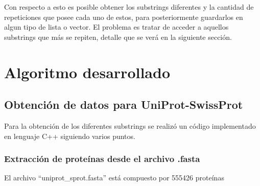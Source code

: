 Con respecto a esto es posible obtener los substrings diferentes y la cantidad de repeticiones que posee cada uno de estos, para posteriormente guardarlos en algun tipo de lista o vector. El problema es tratar de acceder a aquellos substrings que más se repiten, detalle que se verá en la siguiente sección.

\section{Algoritmo desarrollado}

\subsection{Obtención de datos para UniProt-SwissProt}

Para la obtención de los diferentes substrings se realizó un código implementado en lenguaje C++ siguiendo varios puntos.

\subsubsection{Extracción de proteínas desde el archivo .fasta}

El archivo ``uniprot_sprot.fasta'' está compuesto por 555426 proteínas
